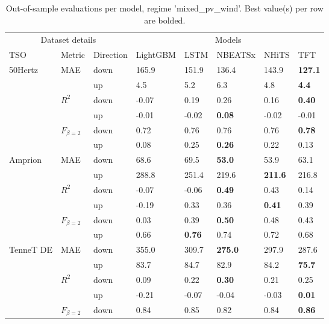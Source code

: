 \begin{table}
\caption{Out-of-sample evaluations per model, regime 'mixed_pv_wind'. Best value(s) per row are bolded.}
\begin{tabular}{llllllll}
\toprule
\multicolumn{3}{c}{Dataset details} & \multicolumn{5}{c}{Models} \\
\cmidrule(lr){1-3}\cmidrule(lr){4-8}
TSO & Metric & Direction & LightGBM & LSTM & NBEATSx & NHiTS & TFT \\
\midrule
\multirow[t]{6}{*}{50Hertz} & \multirow[t]{2}{*}{MAE} & down & 165.9 & 151.9 & 136.4 & 143.9 & \textbf{127.1} \\
 &  & up & 4.5 & 5.2 & 6.3 & 4.8 & \textbf{4.4} \\
\cline{2-8}
 & \multirow[t]{2}{*}{$R^2$} & down & -0.07 & 0.19 & 0.26 & 0.16 & \textbf{0.40} \\
 &  & up & -0.01 & -0.02 & \textbf{0.08} & -0.02 & -0.01 \\
\cline{2-8}
 & \multirow[t]{2}{*}{$F_{\beta=2}$} & down & 0.72 & 0.76 & 0.76 & 0.76 & \textbf{0.78} \\
 &  & up & 0.08 & 0.25 & \textbf{0.26} & 0.22 & 0.13 \\
\cline{1-8} \cline{2-8}
\multirow[t]{6}{*}{Amprion} & \multirow[t]{2}{*}{MAE} & down & 68.6 & 69.5 & \textbf{53.0} & 53.9 & 63.1 \\
 &  & up & 288.8 & 251.4 & 219.6 & \textbf{211.6} & 216.8 \\
\cline{2-8}
 & \multirow[t]{2}{*}{$R^2$} & down & -0.07 & -0.06 & \textbf{0.49} & 0.43 & 0.14 \\
 &  & up & -0.19 & 0.33 & 0.36 & \textbf{0.41} & 0.39 \\
\cline{2-8}
 & \multirow[t]{2}{*}{$F_{\beta=2}$} & down & 0.03 & 0.39 & \textbf{0.50} & 0.48 & 0.43 \\
 &  & up & 0.66 & \textbf{0.76} & 0.74 & 0.72 & 0.68 \\
\cline{1-8} \cline{2-8}
\multirow[t]{6}{*}{TenneT DE} & \multirow[t]{2}{*}{MAE} & down & 355.0 & 309.7 & \textbf{275.0} & 297.9 & 287.6 \\
 &  & up & 83.7 & 84.7 & 82.9 & 84.2 & \textbf{75.7} \\
\cline{2-8}
 & \multirow[t]{2}{*}{$R^2$} & down & 0.09 & 0.22 & \textbf{0.30} & 0.21 & 0.25 \\
 &  & up & -0.21 & -0.07 & -0.04 & -0.03 & \textbf{0.01} \\
\cline{2-8}
 & \multirow[t]{2}{*}{$F_{\beta=2}$} & down & 0.84 & 0.85 & 0.82 & 0.84 & \textbf{0.86} \\

\end{tabular}
\end{table}
